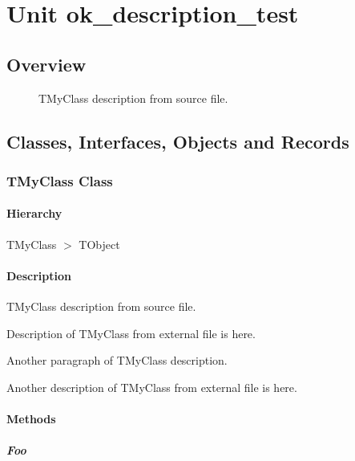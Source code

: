 \documentclass{report}
\begin{document}
\newlength{\tmplength}
\chapter{Unit ok{\_}description{\_}test}
\section{Overview}
\begin{description}
\item[\texttt{\begin{ttfamily}TMyClass\end{ttfamily} Class}]TMyClass description from source file.
\end{description}
\section{Classes, Interfaces, Objects and Records}
\subsection*{TMyClass Class}
\subsubsection*{\large{\textbf{Hierarchy}}\normalsize\hspace{1ex}\hfill}
TMyClass {$>$} TObject
\subsubsection*{\large{\textbf{Description}}\normalsize\hspace{1ex}\hfill}
TMyClass description from source file.

Description of TMyClass from external file is here.

Another paragraph of TMyClass description.

Another description of TMyClass from external file is here.\subsubsection*{\large{\textbf{Methods}}\normalsize\hspace{1ex}\hfill}
\paragraph*{Foo}\hspace*{\fill}
\end{document}
